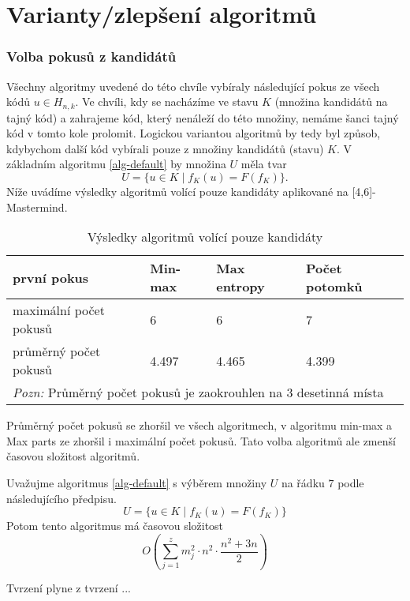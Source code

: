 \section{Varianty/zlepšení algoritmů}
\subsubsection{Volba pokusů z kandidátů}
Všechny algoritmy uvedené do této chvíle vybíraly následující pokus ze všech kódů $u\in H_{n,k}$. Ve chvíli, kdy se nacházíme ve stavu $K$ (množina kandidátů na tajný kód) a zahrajeme kód, který nenáleží do této množiny, nemáme šanci tajný kód v tomto kole prolomit. Logickou variantou algoritmů by tedy byl způsob, kdybychom další kód vybírali pouze z množiny kandidátů (stavu) $K$. V základním algoritmu \ref{alg-default} by množina $U$ měla tvar
\[U = \{u \in K \mid f_K(u) = F(f_K)\}.\]
Níže uvádíme výsledky algoritmů volící pouze kandidáty aplikované na [4,6]-Mastermind.

\begin{table}[h]
\centering
\begin{tabular}{l l l l}
\toprule
první pokus & Min-max & Max entropy & Počet potomků  \\
\midrule

maximální počet pokusů 
& 6 & 6 & 7  \\

průměrný počet pokusů 
& 4.497 & 4.465 & 4.399 \\
\bottomrule
\multicolumn{4}{l}{\footnotesize \textit{Pozn:}
Průměrný počet pokusů je zaokrouhlen na $3$ desetinná místa}
\end{tabular}
\caption{Výsledky algoritmů volící pouze kandidáty}\label{tabminmaxvysl}
\end{table}

Průměrný počet pokusů se zhoršil ve všech algoritmech, v algoritmu min-max a Max parts ze zhoršil i maximální počet pokusů. Tato volba algoritmů ale zmenší časovou složitost algoritmů.

\begin{tvrz}
    Uvažujme algoritmus \ref{alg-default} s výběrem množiny $U$ na řádku $7$ podle následujícího předpisu.
    \[U = \{u \in K \mid f_K(u) = F(f_K)\}\]
    Potom tento algoritmus má časovou složitost 
     \[O \left( \sum_{j = 1}^z  m_j^2 \cdot n^2 \cdot \frac{n^2 + 3n}{2}\right)\]
\end{tvrz}
\begin{dukaz}
    Tvrzení plyne z tvrzení ...
\end{dukaz}


